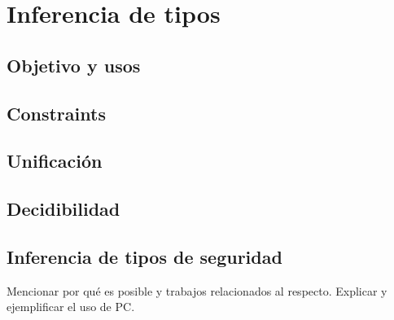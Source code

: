 \section{Inferencia de tipos}
\subsection{Objetivo y usos}
\subsection{Constraints}
\subsection{Unificación}
\subsection{Decidibilidad}

\subsection{Inferencia de tipos de seguridad}
Mencionar por qué es posible y trabajos relacionados al respecto. Explicar y ejemplificar el uso de PC.
